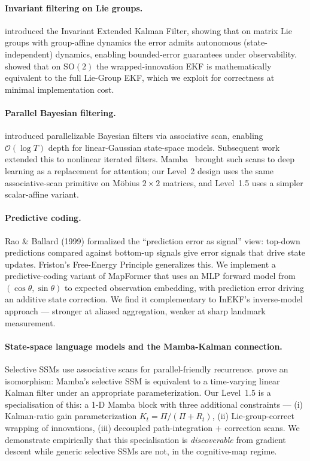\paragraph{Invariant filtering on Lie groups.}
\citet{barrau2017inekf} introduced the Invariant Extended Kalman Filter,
showing that on matrix Lie groups with group-affine dynamics the error
admits autonomous (state-independent) dynamics, enabling bounded-error
guarantees under observability. \citet{markovic2017wrapping} showed that
on $\mathrm{SO}(2)$ the wrapped-innovation EKF is mathematically
equivalent to the full Lie-Group EKF, which we exploit for correctness
at minimal implementation cost.

\paragraph{Parallel Bayesian filtering.}
\citet{sarkka2021parallel} introduced parallelizable Bayesian filters
via associative scan, enabling $\mathcal{O}(\log T)$ depth for
linear-Gaussian state-space models. Subsequent work extended this to
nonlinear iterated filters. Mamba~\citep{gu2024mamba} brought such scans
to deep learning as a replacement for attention; our Level~2 design uses
the same associative-scan primitive on M\"obius $2\times 2$ matrices,
and Level~1.5 uses a simpler scalar-affine variant.

\paragraph{Predictive coding.} Rao \& Ballard (1999) formalized the
``prediction error as signal'' view: top-down predictions compared
against bottom-up signals give error signals that drive state updates.
Friston's Free-Energy Principle generalizes this. We implement a
predictive-coding variant of MapFormer that uses an MLP forward model
from $(\cos\theta, \sin\theta)$ to expected observation embedding, with
prediction error driving an additive state correction. We find it
complementary to InEKF's inverse-model approach --- stronger at aliased
aggregation, weaker at sharp landmark measurement.

\paragraph{State-space language models and the Mamba-Kalman connection.}
Selective SSMs \citep{gu2024mamba} use associative scans for
parallel-friendly recurrence. \citet{wang2025mamba-kalman} prove an
isomorphism: Mamba's selective SSM is equivalent to a time-varying
linear Kalman filter under an appropriate parameterization. Our Level~1.5
is a specialisation of this: a 1-D Mamba block with three additional
constraints --- (i) Kalman-ratio gain parameterization
$K_t = \Pi/(\Pi + R_t)$, (ii) Lie-group-correct wrapping of innovations,
(iii) decoupled path-integration + correction scans. We demonstrate
empirically that this specialisation is \emph{discoverable} from
gradient descent while generic selective SSMs are not, in the
cognitive-map regime.

